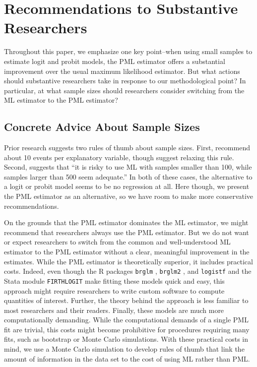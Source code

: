 \documentclass[12pt]{article}
\begin{document}
\section*{Recommendations to Substantive Researchers}

Throughout this paper, we emphasize one key point--when using small samples to estimate logit and probit models, the PML estimator offers a substantial improvement over the usual maximum likelihood estimator. 
But what actions should substantive researchers take in response to our methodological point? 
In particular, at what sample sizes should researchers consider switching from the ML estimator to the PML estimator?

\subsection*{Concrete Advice About Sample Sizes}

Prior research suggests two rules of thumb about sample sizes.
First, \cite{Peduzzietal1996} recommend about 10 events per explanatory variable, though \cite{VittinghoffMcCulloch2007} suggest relaxing this rule. 
Second, \citet[p. 54]{Long1997} suggests that ``it is risky to use ML with samples smaller than 100, while samples larger than 500 seem adequate.'' 
In both of these cases, the alternative to a logit or probit model seems to be no regression at all.
Here though, we present the PML estimator as an alternative, so we have room to make more conservative recommendations.

On the grounds that the PML estimator dominates the ML estimator, we might recommend that researchers always use the PML estimator. 
But we do not want or expect researchers to switch from the common and well-understood ML estimator to the PML estimator without a clear, meaningful improvement in the estimates. 
While the PML estimator is theoretically superior, it includes practical costs. 
Indeed, even though the R packages \texttt{brglm} \citep{brglm}, \texttt{brglm2} \citep{Kosmidis:2017aa}, and \texttt{logistf} \citep{Heinze:2016aa} and the Stata module \texttt{FIRTHLOGIT} \citep{firthlogit} make fitting these models quick and easy, this approach might require researchers to write custom software to compute quantities of interest. 
Further, the theory behind the approach is less familiar to most researchers and their readers. 
Finally, these models are much more computationally demanding.
While the computational demands of a single PML fit are trivial, this costs might become prohibitive for procedures requiring many fits, such as bootstrap or Monte Carlo simulations.
With these practical costs in mind, we use a Monte Carlo simulation to develop rules of thumb that link the amount of information in the data set to the cost of using ML rather than PML. 
\end{document}
